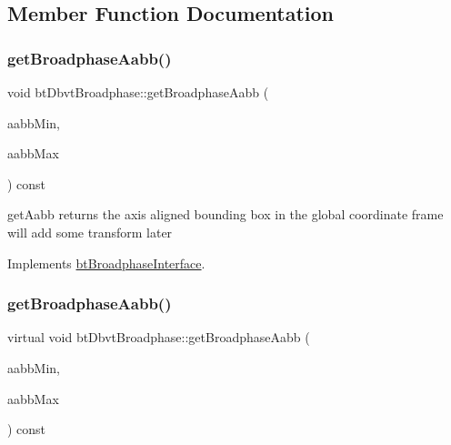 \subsection{Member Function Documentation}
\mbox{\label{structbtDbvtBroadphase_acbd595a9434b6bb045e15ab0d36120e3}} 
\subsubsection{\texorpdfstring{get\+Broadphase\+Aabb()}{getBroadphaseAabb()}\hspace{0.1cm}{\footnotesize\ttfamily [1/2]}}
{\footnotesize\ttfamily void bt\+Dbvt\+Broadphase\+::get\+Broadphase\+Aabb (\begin{DoxyParamCaption}\item[{bt\+Vector3 \&}]{aabb\+Min,  }\item[{bt\+Vector3 \&}]{aabb\+Max }\end{DoxyParamCaption}) const\hspace{0.3cm}{\ttfamily [virtual]}}

get\+Aabb returns the axis aligned bounding box in the \textquotesingle{}global\textquotesingle{} coordinate frame will add some transform later 

Implements \hyperlink{classbtBroadphaseInterface_ab5af9e26414f5a72a76040b8fab4d9e2}{bt\+Broadphase\+Interface}.

\mbox{\label{structbtDbvtBroadphase_ab546a1950f0f0f30dcc897b35e656e0b}} 
\subsubsection{\texorpdfstring{get\+Broadphase\+Aabb()}{getBroadphaseAabb()}\hspace{0.1cm}{\footnotesize\ttfamily [2/2]}}
{\footnotesize\ttfamily virtual void bt\+Dbvt\+Broadphase\+::get\+Broadphase\+Aabb (\begin{DoxyParamCaption}\item[{bt\+Vector3 \&}]{aabb\+Min,  }\item[{bt\+Vector3 \&}]{aabb\+Max }\end{DoxyParamCaption}) const\hspace{0.3cm}{\ttfamily [virtual]}}

